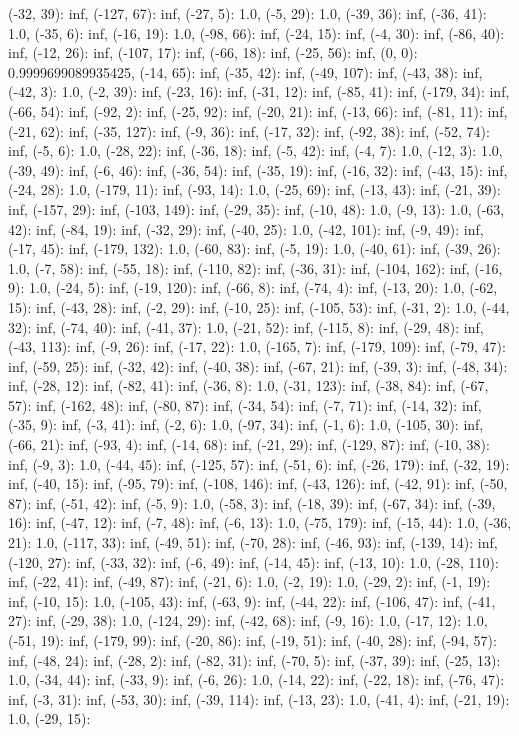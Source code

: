 \documentclass[parskip=half]{scrartcl}
\begin{document}
(-32, 39): inf, (-127, 67): inf, (-27, 5): 1.0, (-5, 29): 1.0, (-39, 36): inf, (-36, 41): 1.0, (-35, 6): inf, (-16, 19): 1.0, (-98, 66): inf, (-24, 15): inf, (-4, 30): inf, (-86, 40): inf, (-12, 26): inf, (-107, 17): inf, (-66, 18): inf, (-25, 56): inf, (0, 0): 0.9999699089935425, (-14, 65): inf, (-35, 42): inf, (-49, 107): inf, (-43, 38): inf, (-42, 3): 1.0, (-2, 39): inf, (-23, 16): inf, (-31, 12): inf, (-85, 41): inf, (-179, 34): inf, (-66, 54): inf, (-92, 2): inf, (-25, 92): inf, (-20, 21): inf, (-13, 66): inf, (-81, 11): inf, (-21, 62): inf, (-35, 127): inf, (-9, 36): inf, (-17, 32): inf, (-92, 38): inf, (-52, 74): inf, (-5, 6): 1.0, (-28, 22): inf, (-36, 18): inf, (-5, 42): inf, (-4, 7): 1.0, (-12, 3): 1.0, (-39, 49): inf, (-6, 46): inf, (-36, 54): inf, (-35, 19): inf, (-16, 32): inf, (-43, 15): inf, (-24, 28): 1.0, (-179, 11): inf, (-93, 14): 1.0, (-25, 69): inf, (-13, 43): inf, (-21, 39): inf, (-157, 29): inf, (-103, 149): inf, (-29, 35): inf, (-10, 48): 1.0, (-9, 13): 1.0, (-63, 42): inf, (-84, 19): inf, (-32, 29): inf, (-40, 25): 1.0, (-42, 101): inf, (-9, 49): inf, (-17, 45): inf, (-179, 132): 1.0, (-60, 83): inf, (-5, 19): 1.0, (-40, 61): inf, (-39, 26): 1.0, (-7, 58): inf, (-55, 18): inf, (-110, 82): inf, (-36, 31): inf, (-104, 162): inf, (-16, 9): 1.0, (-24, 5): inf, (-19, 120): inf, (-66, 8): inf, (-74, 4): inf, (-13, 20): 1.0, (-62, 15): inf, (-43, 28): inf, (-2, 29): inf, (-10, 25): inf, (-105, 53): inf, (-31, 2): 1.0, (-44, 32): inf, (-74, 40): inf, (-41, 37): 1.0, (-21, 52): inf, (-115, 8): inf, (-29, 48): inf, (-43, 113): inf, (-9, 26): inf, (-17, 22): 1.0, (-165, 7): inf, (-179, 109): inf, (-79, 47): inf, (-59, 25): inf, (-32, 42): inf, (-40, 38): inf, (-67, 21): inf, (-39, 3): inf, (-48, 34): inf, (-28, 12): inf, (-82, 41): inf, (-36, 8): 1.0, (-31, 123): inf, (-38, 84): inf, (-67, 57): inf, (-162, 48): inf, (-80, 87): inf, (-34, 54): inf, (-7, 71): inf, (-14, 32): inf, (-35, 9): inf, (-3, 41): inf, (-2, 6): 1.0, (-97, 34): inf, (-1, 6): 1.0, (-105, 30): inf, (-66, 21): inf, (-93, 4): inf, (-14, 68): inf, (-21, 29): inf, (-129, 87): inf, (-10, 38): inf, (-9, 3): 1.0, (-44, 45): inf, (-125, 57): inf, (-51, 6): inf, (-26, 179): inf, (-32, 19): inf, (-40, 15): inf, (-95, 79): inf, (-108, 146): inf, (-43, 126): inf, (-42, 91): inf, (-50, 87): inf, (-51, 42): inf, (-5, 9): 1.0, (-58, 3): inf, (-18, 39): inf, (-67, 34): inf, (-39, 16): inf, (-47, 12): inf, (-7, 48): inf, (-6, 13): 1.0, (-75, 179): inf, (-15, 44): 1.0, (-36, 21): 1.0, (-117, 33): inf, (-49, 51): inf, (-70, 28): inf, (-46, 93): inf, (-139, 14): inf, (-120, 27): inf, (-33, 32): inf, (-6, 49): inf, (-14, 45): inf, (-13, 10): 1.0, (-28, 110): inf, (-22, 41): inf, (-49, 87): inf, (-21, 6): 1.0, (-2, 19): 1.0, (-29, 2): inf, (-1, 19): inf, (-10, 15): 1.0, (-105, 43): inf, (-63, 9): inf, (-44, 22): inf, (-106, 47): inf, (-41, 27): inf, (-29, 38): 1.0, (-124, 29): inf, (-42, 68): inf, (-9, 16): 1.0, (-17, 12): 1.0, (-51, 19): inf, (-179, 99): inf, (-20, 86): inf, (-19, 51): inf, (-40, 28): inf, (-94, 57): inf, (-48, 24): inf, (-28, 2): inf, (-82, 31): inf, (-70, 5): inf, (-37, 39): inf, (-25, 13): 1.0, (-34, 44): inf, (-33, 9): inf, (-6, 26): 1.0, (-14, 22): inf, (-22, 18): inf, (-76, 47): inf, (-3, 31): inf, (-53, 30): inf, (-39, 114): inf, (-13, 23): 1.0, (-41, 4): inf, (-21, 19): 1.0, (-29, 15): 
\end{document}
